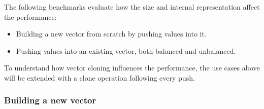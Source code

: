 The following benchmarks evaluate how the size and internal representation affect the performance:

\begin{itemize}
    \item Building a new vector from scratch by pushing values into it. 
    \item Pushing values into an existing vector, both balanced and unbalanced. 
\end{itemize}

To understand how vector cloning influences the performance, the use cases above will be extended with a clone operation following every push. 

\subsubsection*{Building a new vector}

